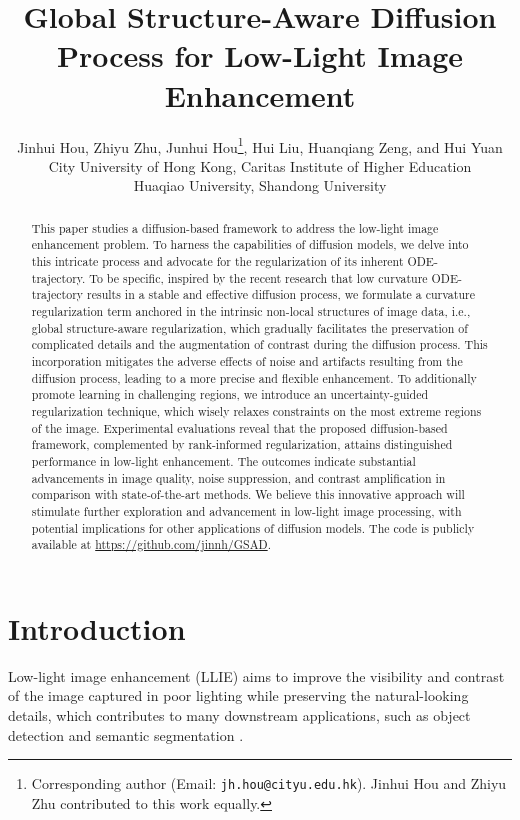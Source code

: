 \documentclass{article}
\title{Global Structure-Aware Diffusion Process for Low-Light Image Enhancement}
\author{Jinhui Hou, Zhiyu Zhu, Junhui Hou\thanks{Corresponding author (Email: \texttt{jh.hou@cityu.edu.hk}). Jinhui Hou and Zhiyu Zhu contributed to this work equally. }, Hui Liu, Huanqiang Zeng, and Hui Yuan  \\
  City University of Hong Kong, Caritas Institute of Higher Education \\ Huaqiao University, Shandong University
}
\begin{document}
\maketitle


\begin{abstract}




This paper studies a diffusion-based framework to address the low-light image enhancement problem. To harness the capabilities of diffusion models, we delve into this intricate process and advocate for the regularization of its inherent ODE-trajectory. To be specific, inspired by the recent research that low curvature ODE-trajectory results in a stable and effective diffusion process, we formulate a curvature regularization term anchored in the intrinsic non-local structures of image data, i.e., global structure-aware regularization, which gradually facilitates the preservation of complicated details and the augmentation of contrast during the diffusion process. This incorporation mitigates the adverse effects of noise and artifacts resulting from the diffusion process, leading to a more precise and flexible enhancement. To additionally promote learning in challenging regions, we introduce an uncertainty-guided regularization technique, which wisely relaxes constraints on the most extreme regions of the image. Experimental evaluations reveal that the proposed diffusion-based framework, complemented by rank-informed regularization, attains distinguished performance in low-light enhancement. The outcomes indicate substantial advancements in image quality, noise suppression, and contrast amplification in comparison with state-of-the-art methods. We believe this innovative approach will stimulate further exploration and advancement in low-light image processing, with potential implications for other applications of diffusion models. The code is publicly available at \url{https://github.com/jinnh/GSAD}.

\end{abstract}

\section{Introduction}

Low-light image enhancement (LLIE) aims to improve the visibility and contrast of the image captured in poor lighting while preserving the natural-looking details, which contributes to many downstream applications, such as object detection \cite{lin2017feature,zhang2017s3fd} and semantic segmentation  \cite{zhao2017pyramid,xie2021segformer}.
\end{document}
